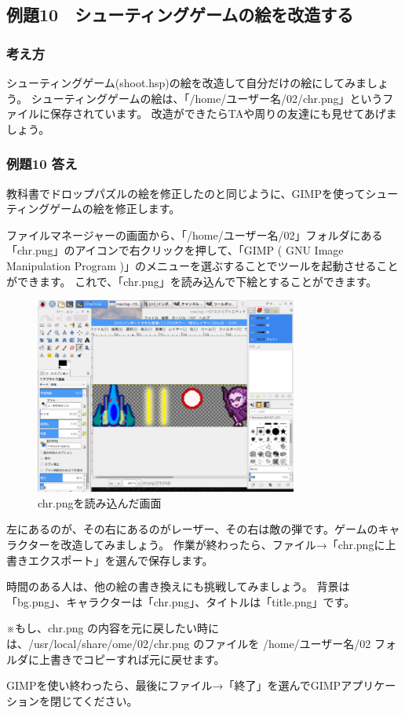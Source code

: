 \clearpage

\subsection{例題10　シューティングゲームの絵を改造する}

\subsubsection*{考え方}

シューティングゲーム(shoot.hsp)の絵を改造して自分だけの絵にしてみましょう。
シューティングゲームの絵は、「/home/ユーザー名/02/chr.png」というファイルに保存されています。
改造ができたらTAや周りの友達にも見せてあげましょう。

\subsubsection*{例題10 答え}

教科書でドロップパズルの絵を修正したのと同じように、GIMPを使ってシューティングゲームの絵を修正します。

ファイルマネージャーの画面から、「/home/ユーザー名/02」フォルダにある「chr.png」のアイコンで右クリックを押して、「GIMP ( GNU Image Manipulation Program )」のメニューを選ぶすることでツールを起動させることができます。
これで、「chr.png」を読み込んで下絵とすることができます。

\begin{figure}[H]
    \begin{center}
        \includegraphics[keepaspectratio,width=8.625cm,height=6.459cm]{text02-img/text02-img042.png}
        \caption{chr.pngを読み込んだ画面}
    \end{center}
\end{figure}

左にあるのが、その右にあるのがレーザー、その右は敵の弾です。ゲームのキャラクターを改造してみましょう。
作業が終わったら、ファイル→「chr.pngに上書きエクスポート」を選んで保存します。

時間のある人は、他の絵の書き換えにも挑戦してみましょう。
背景は「bg.png」、キャラクターは「chr.png」、タイトルは「title.png」です。

※もし、chr.png の内容を元に戻したい時には、/usr/local/share/ome/02/chr.png のファイルを /home/ユーザー名/02 フォルダに上書きでコピーすれば元に戻せます。

GIMPを使い終わったら、最後にファイル→「終了」を選んでGIMPアプリケーションを閉じてください。

